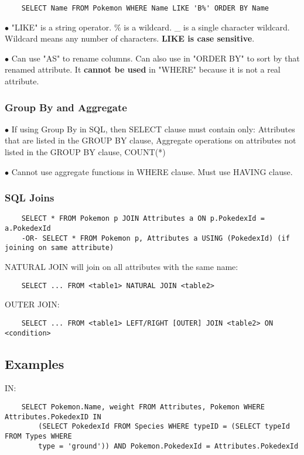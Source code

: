 \documentclass[9pt]{extarticle}
\begin{document}
\begin{verbatim}
    SELECT Name FROM Pokemon WHERE Name LIKE 'B%' ORDER BY Name
\end{verbatim}
$\bullet$ "LIKE" is a string operator. \% is a wildcard. \_ is a single character 
wildcard. Wildcard means any number of characters. \textbf{LIKE is case 
sensitive}.

$\bullet$ Can use "AS" to rename columns. Can also use in "ORDER BY" to sort by that 
renamed attribute. It \textbf{cannot be used} in "WHERE" because it is not a 
real attribute.

\subsubsection*{Group By and Aggregate}
$\bullet$ If using Group By in SQL, then SELECT clause must contain only: 
Attributes that are listed in the GROUP BY clause, Aggregate operations on 
attributes not listed in the GROUP BY clause, COUNT(*)

$\bullet$ Cannot use aggregate functions in WHERE clause. Must use HAVING clause.

\subsubsection*{SQL Joins}
\begin{verbatim}
    SELECT * FROM Pokemon p JOIN Attributes a ON p.PokedexId = a.PokedexId
    -OR- SELECT * FROM Pokemon p, Attributes a USING (PokedexId) (if joining on same attribute)
\end{verbatim}
NATURAL JOIN will join on all attributes with the same name:
\begin{verbatim}
    SELECT ... FROM <table1> NATURAL JOIN <table2>
\end{verbatim}
OUTER JOIN:
\begin{verbatim}
    SELECT ... FROM <table1> LEFT/RIGHT [OUTER] JOIN <table2> ON <condition>
\end{verbatim}

\subsection*{Examples}

IN:
\begin{verbatim}
    SELECT Pokemon.Name, weight FROM Attributes, Pokemon WHERE Attributes.PokedexID IN
        (SELECT PokedexId FROM Species WHERE typeID = (SELECT typeId FROM Types WHERE 
        type = 'ground')) AND Pokemon.PokedexId = Attributes.PokedexId
\end{verbatim}
\end{document}
